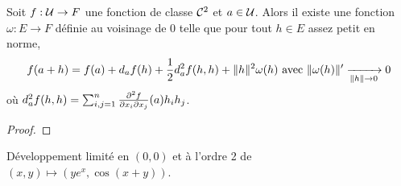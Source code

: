 \begin{theorem}
	Soit $f:\mathcal{U} \to F$ une fonction de classe $\mathcal{C}^2$ et $ a \in \mathcal{U}$. Alors il existe une fonction $\omega: E \to F$ définie au voisinage de 0 telle que pour tout $h\in E$ assez petit en norme,
	\[
		f(a+h) = f(a) + d_a f(h) + \frac{1}{2}d_a^2 f (h,h) + \lVert h \rVert^2 \omega(h) \text{ avec } \lVert\omega(h) \rVert'\xrightarrow[\lVert h\rVert \to 0]{} 0
	\]
	où $
	d^2_a f(h,h) =  \sum_{i,j=1}^n \frac{\partial^2 f}{ \partial x_{i} \partial x_{j} } (a) h_{i}h_{j}$.
\end{theorem}

\begin{proof}
	\pl{\rep{6cm}}
\end{proof}
\begin{exemple}
	Développement  limité en $(0,0)$  et à l'ordre 2 de $(x,y) \mapsto (ye^x,\cos(x+y))$. 
	\pl{\rep{9cm}}
\end{exemple}


